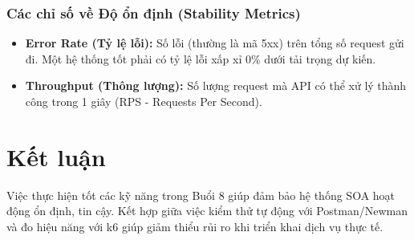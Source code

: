 \documentclass[12pt, a4paper]{article}
\begin{document}
\subsubsection{Các chỉ số về Độ ổn định (Stability Metrics)}
\begin{itemize}
    \item \textbf{Error Rate (Tỷ lệ lỗi):} Số lỗi (thường là mã 5xx) trên tổng số request gửi đi. Một hệ thống tốt phải có tỷ lệ lỗi xấp xỉ 0\% dưới tải trọng dự kiến.
    \item \textbf{Throughput (Thông lượng):} Số lượng request mà API có thể xử lý thành công trong 1 giây (RPS - Requests Per Second).
\end{itemize}

\section{Kết luận}
Việc thực hiện tốt các kỹ năng trong Buổi 8 giúp đảm bảo hệ thống SOA hoạt động ổn định, tin cậy. Kết hợp giữa việc kiểm thử tự động với Postman/Newman và đo hiệu năng với k6 giúp giảm thiểu rủi ro khi triển khai dịch vụ thực tế.
\end{document}
